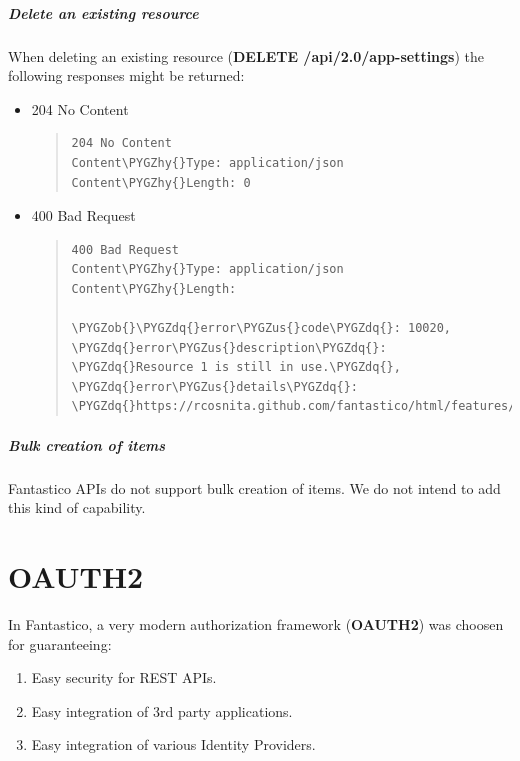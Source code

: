 \documentclass[letterpaper,10pt,english]{sphinxmanual}
\def\PYGZus{\char`\_}
\def\PYGZob{\char`\{}
\def\PYGZcb{\char`\}}
\def\PYGZhy{\char`\-}
\def\PYGZdq{\char`\"}
\begin{document}
\subparagraph{Delete an existing resource}
\label{features/roa/rest_responses:delete-an-existing-resource}
When deleting an existing resource (\textbf{DELETE /api/2.0/app-settings}) the following responses might be returned:
\begin{itemize}
\item {} 
204 No Content
\begin{quote}

\begin{Verbatim}[commandchars=\\\{\}]
204 No Content
Content\PYGZhy{}Type: application/json
Content\PYGZhy{}Length: 0
\end{Verbatim}
\end{quote}

\item {} 
400 Bad Request
\begin{quote}

\begin{Verbatim}[commandchars=\\\{\}]
400 Bad Request
Content\PYGZhy{}Type: application/json
Content\PYGZhy{}Length:

\PYGZob{}\PYGZdq{}error\PYGZus{}code\PYGZdq{}: 10020, \PYGZdq{}error\PYGZus{}description\PYGZdq{}: \PYGZdq{}Resource 1 is still in use.\PYGZdq{}, \PYGZdq{}error\PYGZus{}details\PYGZdq{}: \PYGZdq{}https://rcosnita.github.com/fantastico/html/features/roa/1000x.html\PYGZdq{}\PYGZcb{}
\end{Verbatim}
\end{quote}

\end{itemize}


\subparagraph{Bulk creation of items}
\label{features/roa/rest_responses:bulk-creation-of-items}
Fantastico APIs do not support bulk creation of items. We do not intend to add this kind of capability.


\section{OAUTH2}
\label{features/oauth2:oauth2}\label{features/oauth2::doc}
In Fantastico, a very modern authorization framework (\textbf{OAUTH2}) was choosen for guaranteeing:
\begin{enumerate}
\item {} 
Easy security for REST APIs.

\item {} 
Easy integration of 3rd party applications.

\item {} 
Easy integration of various Identity Providers.

\end{enumerate}
\end{document}
